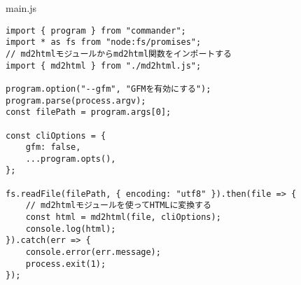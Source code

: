 \begin{listtitle}
main.js
\end{listtitle}
\begin{lstlisting}
import { program } from "commander";
import * as fs from "node:fs/promises";
// md2htmlモジュールからmd2html関数をインポートする
import { md2html } from "./md2html.js";

program.option("--gfm", "GFMを有効にする");
program.parse(process.argv);
const filePath = program.args[0];

const cliOptions = {
    gfm: false,
    ...program.opts(),
};

fs.readFile(filePath, { encoding: "utf8" }).then(file => {
    // md2htmlモジュールを使ってHTMLに変換する
    const html = md2html(file, cliOptions);
    console.log(html);
}).catch(err => {
    console.error(err.message);
    process.exit(1);
});
\end{lstlisting}
\listend
